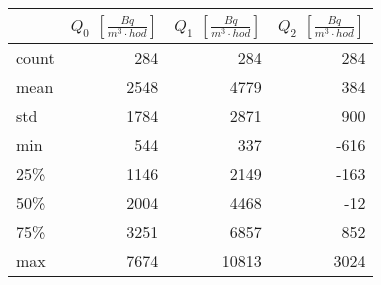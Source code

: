 \begin{tabular}{lrrr}
\toprule
{} &  $Q_0$ $\left[\si{\frac{Bq}{m^3\cdot hod}}\right]$ &  $Q_1$ $\left[\si{\frac{Bq}{m^3\cdot hod}}\right]$ &  $Q_2$ $\left[\si{\frac{Bq}{m^3\cdot hod}}\right]$ \\
\midrule
count &                                                284 &                                                284 &                                                284 \\
mean  &                                               2548 &                                               4779 &                                                384 \\
std   &                                               1784 &                                               2871 &                                                900 \\
min   &                                                544 &                                                337 &                                               -616 \\
25\%   &                                               1146 &                                               2149 &                                               -163 \\
50\%   &                                               2004 &                                               4468 &                                                -12 \\
75\%   &                                               3251 &                                               6857 &                                                852 \\
max   &                                               7674 &                                              10813 &                                               3024 \\
\bottomrule
\end{tabular}
